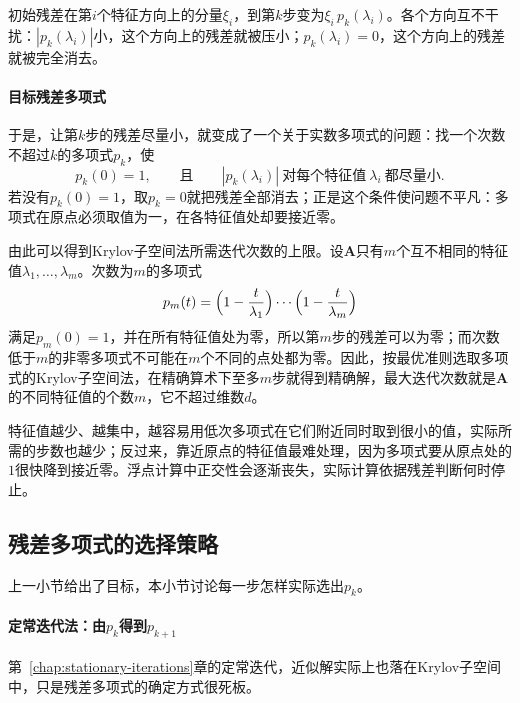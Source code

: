 初始残差在第$i$个特征方向上的分量$\xi_i$，到第$k$步变为$\xi_i\,p_k(\lambda_i)$。各个方向互不干扰：$|p_k(\lambda_i)|$小，这个方向上的残差就被压小；$p_k(\lambda_i)=0$，这个方向上的残差就被完全消去。

\paragraph{目标残差多项式}
于是，让第$k$步的残差尽量小，就变成了一个关于实数多项式的问题：找一个次数不超过$k$的多项式$p_k$，使
\begin{equation}
 p_k(0)=1,\qquad\text{且}\qquad |p_k(\lambda_i)|\ \text{对每个特征值}\ \lambda_i\ \text{都尽量小}.
 \label{eq:ls-krylov-polynomial-target}
\end{equation}
若没有$p_k(0)=1$，取$p_k=0$就把残差全部消去；正是这个条件使问题不平凡：多项式在原点必须取值为一，在各特征值处却要接近零。

由此可以得到Krylov子空间法所需迭代次数的上限。设$\bm A$只有$m$个互不相同的特征值$\lambda_1,\ldots,\lambda_m$。次数为$m$的多项式
\begin{equation}
 p_m(t)=\Bigl(1-\frac{t}{\lambda_1}\Bigr)\cdots\Bigl(1-\frac{t}{\lambda_m}\Bigr)
 \label{eq:ls-krylov-annihilating-polynomial}
\end{equation}
满足$p_m(0)=1$，并在所有特征值处为零，所以第$m$步的残差可以为零；而次数低于$m$的非零多项式不可能在$m$个不同的点处都为零。因此，按最优准则选取多项式的Krylov子空间法，在精确算术下至多$m$步就得到精确解，最大迭代次数就是$\bm A$的不同特征值的个数$m$，它不超过维数$d$。

特征值越少、越集中，越容易用低次多项式在它们附近同时取到很小的值，实际所需的步数也越少；反过来，靠近原点的特征值最难处理，因为多项式要从原点处的$1$很快降到接近零。浮点计算中正交性会逐渐丧失，实际计算依据残差判断何时停止。

\subsection{残差多项式的选择策略}
\label{sec:ls-krylov-selection-criteria}

上一小节给出了目标，本小节讨论每一步怎样实际选出$p_k$。

\paragraph{定常迭代法：由$p_k$得到$p_{k+1}$}
第~\ref{chap:stationary-iterations}章的定常迭代，近似解实际上也落在Krylov子空间中，只是残差多项式的确定方式很死板。

